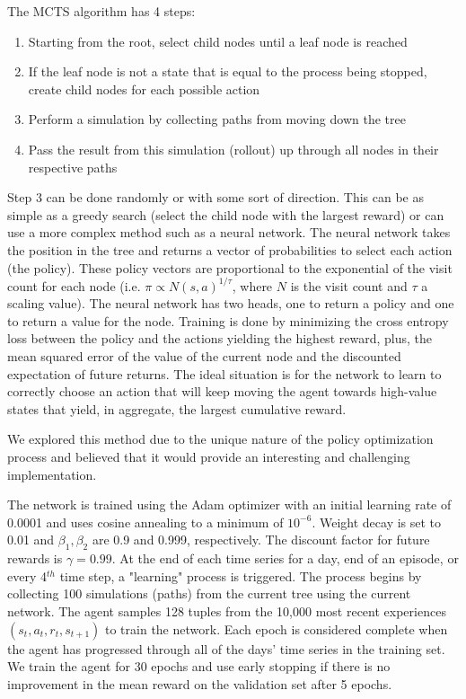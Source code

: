\documentclass[12pt]{article}
\begin{document}
The MCTS algorithm has 4 steps:
\begin{enumerate}
    \item Starting from the root, select child nodes until a leaf node is reached
    \item If the leaf node is not a state that is equal to the process being stopped, create child nodes for each
        possible action
    \item Perform a simulation by collecting paths from moving down the tree
    \item Pass the result from this simulation (rollout) up through all nodes in their respective paths
\end{enumerate}
Step 3 can be done randomly or with some sort of direction. This can be as simple as a greedy search (select the
child node with the largest reward) or can use a more complex method such as a neural network\cite{silver_mastering_2017,silver_mastering_2016}.
The neural network takes the position in the tree and returns a vector of probabilities to select each action
(the policy). These policy vectors are proportional to the exponential of the visit count for each node (i.e. 
$\pi\propto N(s,a)^{1/\tau}$, where $N$ is the visit count and $\tau$ a scaling value). The
neural network has two heads, one to return a policy and one to return a value for the node. Training is done
by minimizing the cross entropy loss between the policy and the actions yielding the highest reward, plus, the
mean squared error of the value of the current node and the discounted expectation of future returns. The ideal
situation is for the network to learn to correctly choose an action that will keep moving the agent towards
high-value states that yield, in aggregate, the largest cumulative reward.

We explored this method due to the unique nature of the policy optimization process and believed that it would
provide an interesting and challenging implementation.

The network is trained using the Adam optimizer\cite{Kingma2014AdamAM} with an initial learning rate of 0.0001
and uses cosine annealing to a minimum of $10^{-6}$. Weight decay is set to 0.01 and $\beta_1,\beta_2$ are 0.9
and 0.999, respectively. The discount factor for future rewards is $\gamma=0.99$. At the end of each time series
for a day, end of an episode, or every 4$^{th}$ time step, a "learning" process is triggered. The process begins
by collecting 100 simulations (paths) from the current tree using the current network. The agent samples
128 tuples from the 10,000 most recent experiences $\left(s_t, a_t, r_t, s_{t+1}\right)$ to train the network. Each epoch
is considered complete when the agent has progressed through all of the days' time series in the training set.
We train the agent for 30 epochs and use early stopping if there is no improvement in the mean reward on the
validation set after 5 epochs.
\end{document}

